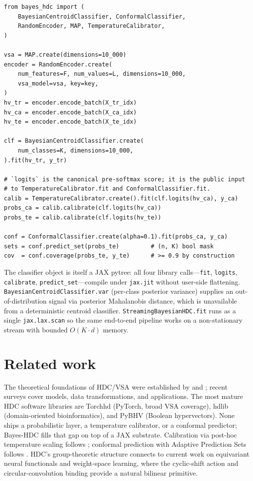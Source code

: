 \documentclass[twoside,11pt]{article}
\begin{document}
\begin{lstlisting}[caption={A PVSA classification pipeline with calibration and coverage guarantees.},label={lst:pvsa}]
from bayes_hdc import (
    BayesianCentroidClassifier, ConformalClassifier,
    RandomEncoder, MAP, TemperatureCalibrator,
)

vsa = MAP.create(dimensions=10_000)
encoder = RandomEncoder.create(
    num_features=F, num_values=L, dimensions=10_000,
    vsa_model=vsa, key=key,
)
hv_tr = encoder.encode_batch(X_tr_idx)
hv_ca = encoder.encode_batch(X_ca_idx)
hv_te = encoder.encode_batch(X_te_idx)

clf = BayesianCentroidClassifier.create(
    num_classes=K, dimensions=10_000,
).fit(hv_tr, y_tr)

# `logits` is the canonical pre-softmax score; it is the public input
# to TemperatureCalibrator.fit and ConformalClassifier.fit.
calib = TemperatureCalibrator.create().fit(clf.logits(hv_ca), y_ca)
probs_ca = calib.calibrate(clf.logits(hv_ca))
probs_te = calib.calibrate(clf.logits(hv_te))

conf = ConformalClassifier.create(alpha=0.1).fit(probs_ca, y_ca)
sets = conf.predict_set(probs_te)         # (n, K) bool mask
cov  = conf.coverage(probs_te, y_te)      # >= 0.9 by construction
\end{lstlisting}

The classifier object is itself a JAX pytree: all four library calls---\texttt{fit}, \texttt{logits}, \texttt{calibrate}, \texttt{predict\_set}---compile under \texttt{jax.jit} without user-side flattening. \texttt{BayesianCentroidClassifier.var} (per-class posterior variance) supplies an out-of-distribution signal via posterior Mahalanobis distance, which is unavailable from a deterministic centroid classifier. \texttt{StreamingBayesianHDC.fit} runs as a single \texttt{jax.lax.scan} so the same end-to-end pipeline works on a non-stationary stream with bounded $O(K \cdot d)$ memory.

\section{Related work}
\label{sec:related}

The theoretical foundations of HDC/VSA were established by \citet{kanerva1988sparse,kanerva2009hyperdimensional} and \citet{plate1995holographic}; recent surveys \citep{kleyko2022survey1,kleyko2022survey2} cover models, data transformations, and applications. The most mature HDC software libraries are Torchhd \citep{heddes2023torchhd} (PyTorch, broad VSA coverage), hdlib \citep{cumbo2023hdlib} (domain-oriented bioinformatics), and PyBHV \citep{vandervorst2023pybhv} (Boolean hypervectors). None ships a probabilistic layer, a temperature calibrator, or a conformal predictor; Bayes-HDC fills that gap on top of a JAX substrate. Calibration via post-hoc temperature scaling follows \citet{guo2017calibration}; conformal prediction with Adaptive Prediction Sets follows \citet{romano2020classification}. HDC's group-theoretic structure connects to current work on equivariant neural functionals and weight-space learning, where the cyclic-shift action and circular-convolution binding provide a natural bilinear primitive.
\end{document}
